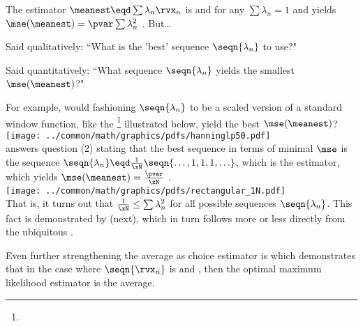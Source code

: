 The  estimator $\meanest\eqd\sum\lambda_n\rvx_n$
is  and  for any $\sum\lambda_n=1$ and
yields  $\mse(\meanest)=\pvar\sum\lambda_n^2$
.
But\ldots
\begin{enume}
  \item Said qualitatively: ``What is the 'best' sequence $\seqn{\lambda_n}$ to use?"
  \item Said quantitatively: ``What sequence $\seqn{\lambda_n}$ yields the smallest $\mse(\meanest)$?"
\end{enume}
For example, would fashioning $\seqn{\lambda_n}$ to be a scaled version of a standard
window function, like the \footnote{
  }
illustrated below, yield the best $\mse(\meanest)$?
\\\indentx\texttt{[image: ../common/math/graphics/pdfs/hanninglp50.pdf]}
\\
 answers question (2) stating
that the best sequence in terms of minimal $\mse$
is the sequence $\seqn{\lambda_n}\eqd\frac{1}{\xN}\seqn{\ldots,1,1,1,\ldots}$,
which is the  estimator,
which yields  $\mse(\meanest)= \frac{\pvar}{\xN}$ .
\\\indentx\texttt{[image: ../common/math/graphics/pdfs/rectangular\_1N.pdf]}
\\
That is, it turns out that $\frac{1}{\xN}\le\sum\lambda_n^2$ for all possible sequences $\seqn{\lambda_n}$.
This fact is demonstrated by  (next),
which in turn follows more or less directly from the ubiquitous
 .

Even further strengthening the average as choice estimator is 
which demonstrates that in the case where $\seqn{\rvx_n}$ is  and
, then the optimal maximum likelihood estimator is the average.

